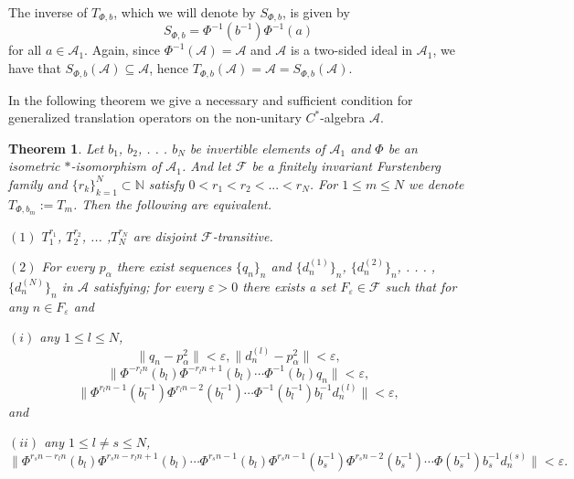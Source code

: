 \documentclass{article}
\newtheorem{theorem}{Theorem}[section]
\begin{document}
The inverse of $T_{\Phi,b}$, which we will denote by $S_{\Phi, b}$, is given by 
\[S_{\Phi,b}=\Phi^{-1}(b^{-1})\Phi^{-1}(a)\] 
for all $a\in\mathcal{A}_{1}$. 
Again, since $\Phi^{-1}(\mathcal{A})=\mathcal{A}$ and $\mathcal{A}$ is a two-sided
ideal in $\mathcal{A}_{1}$, we have that $S_{\Phi,b}(\mathcal{A})\subseteq\mathcal{A}$, hence $T_{\Phi,b}(\mathcal{A})=\mathcal{A}=S_{\Phi,b}(\mathcal{A})$.

In the following theorem we give a necessary and sufficient condition for generalized translation operators on the non-unitary $C^{\ast}$-algebra $\mathcal{A}$.

\begin{theorem}\label{the4.1}
Let $b_{1}$, $b_{2}$, . . . $b_{N}$ be invertible elements of $\mathcal{A}_{1}$ and $\Phi$ be an isometric $\ast$-isomorphism of $\mathcal{A}_{1}$. And let $\mathcal{F}$ be a finitely invariant Furstenberg family and $\{r_{k}\}^{N}_{k=1}\subset \mathbb{N}$ satisfy $0<r_{1}<r_{2}<...<r_{N}$. For $1\leq m\leq N$ we denote $T_{\Phi, b_{m}}:=T_{m}$. Then the following are equivalent.

$(1)$ $T^{r_{1}}_{1}$, $T^{r_{2}}_{2}$, ... ,$T^{r_{N}}_{N}$ are disjoint $\mathcal{F}$-transitive.

$(2)$ For every $p_{\alpha}$ there exist sequences $\{q_{n}\}_{n}$ and $\{d^{(1)}_{n}\}_{n}$, $\{d^{(2)}_{n}\}_{n}$, . . . , $\{d^{(N)}_{n}\}_{n}$ in $\mathcal{A}$ satisfying;
for every $\varepsilon>0$ there exists a set $F_{\varepsilon}\in\mathcal{F}$ such that  for any $n\in F_{\varepsilon}$ and

$(i)$ any $1\leq l\leq N$,
\[\|q_{n}-p^{2}_{\alpha}\|<\varepsilon, \|d^{(l)}_{n}-p^{2}_{\alpha}\|<\varepsilon,\]
\[\|\Phi^{-r_{l}n}(b_{l})\Phi^{-r_{l}n+1}(b_{l})\cdots \Phi^{-1}(b_{l})q_{n}\|<\varepsilon,\]
\[\|\Phi^{r_{l}n-1}(b^{-1}_{l})\Phi^{r_{l}n-2}(b^{-1}_{l})\cdots\Phi^{-1}(b^{-1}_{l})b^{-1}_{l}d^{(l)}_{n}\|<\varepsilon,\]
and

$(ii)$ any $1\leq l\neq s \leq N$,
\[\|\Phi^{r_{s}n-r_{l}n}(b_{l})\Phi^{r_{s}n-r_{l}n+1}(b_{l})\cdots\Phi^{r_{s}n-1}(b_{l})\Phi^{r_{s}n-1}(b^{-1}_{s})\Phi^{r_{s}n-2}(b^{-1}_{s})\cdots \Phi(b^{-1}_{s})b^{-1}_{s}d^{(s)}_{n}\|<\varepsilon.\]
\end{theorem}
\end{document}
